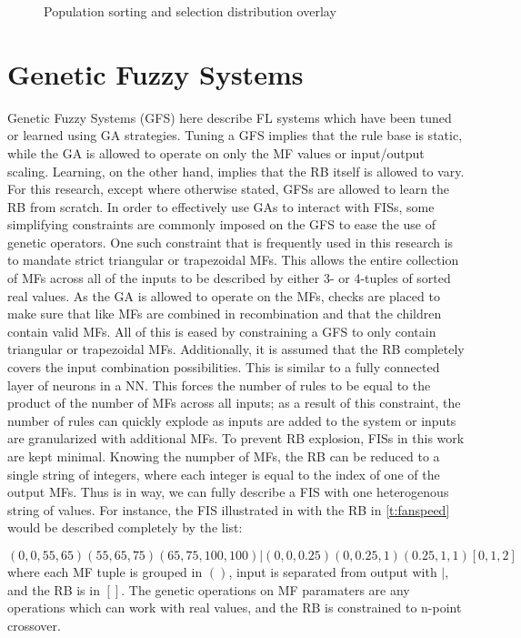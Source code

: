 \begin{figure}
    \centering
    
    \caption{Population sorting and selection distribution overlay}\label{f:sort-select}
\end{figure}
    
\section{Genetic Fuzzy Systems}
Genetic Fuzzy Systems (GFS) here describe FL systems which have been tuned or learned using GA strategies.
Tuning a GFS implies that the rule base is static, while the GA is allowed to operate on only the MF values or
input/output scaling. Learning, on the other hand, implies that the RB itself is allowed to vary. For this
research, except where otherwise stated, GFSs are allowed to learn the RB from scratch. In order to
effectively use GAs to interact with FISs, some simplifying constraints are commonly imposed on the GFS to
ease the use of genetic operators. One such constraint that is frequently used in this research is to mandate
strict triangular or trapezoidal MFs. This allows the entire collection of MFs across all of the inputs to be
described by either 3- or 4-tuples of sorted real values. As the GA is allowed to operate on the MFs, checks
are placed to make sure that like MFs are combined in recombination and that the children contain valid MFs.
All of this is eased by constraining a GFS to only contain triangular or trapezoidal MFs. Additionally, it is
assumed that the RB completely covers the input combination possibilities. This is similar to a fully
connected layer of neurons in a NN. This forces the number of rules to be equal to the product of the number
of MFs across all inputs; as a result of this constraint, the number of rules can quickly explode as inputs
are added to the system or inputs are granularized with additional MFs. To prevent RB explosion, FISs in this
work are kept minimal. Knowing the numpber of MFs, the RB can be reduced to a single string of integers, where
each integer is equal to the index of one of the output MFs. Thus is in way, we can fully describe a FIS with
one heterogenous string of values. For instance, the FIS illustrated in 
with the RB in \cref{t:fanspeed} would be described completely by the list:

\begin{equation*}
    \left(0, 0, 55, 65\right) \left(55, 65, 75\right) \left(65, 75, 100, 100\right)
    |\left(0, 0, 0.25\right) \left(0, 0.25, 1\right) \left(0.25, 1, 1\right)
    \left[0, 1, 2\right]
\end{equation*}
where each MF tuple is grouped in $\left(\right)$, input is separated from output with $|$, and the RB is in
$\left[\right]$. The genetic operations on MF paramaters are any operations which can work with real values,
and the RB is constrained to n-point crossover.

